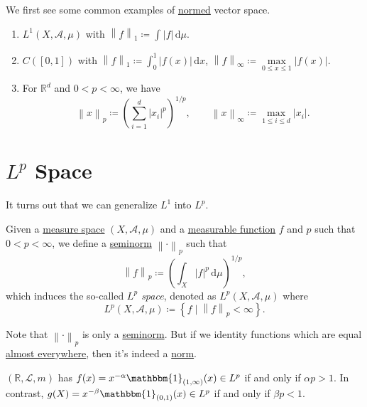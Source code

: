 \begin{eg}
	We first see some common examples of \hyperref[def:norm]{normed} vector space.
	\begin{enumerate}[(1)]
		\item \(L^1(X, \mathcal{A}  , \mu )\) with \(\left\lVert f\right\rVert _1 \coloneqq \int_{}^{} \left\vert f \right\vert  \,\mathrm{d}\mu  \).
		\item \(C([0, 1])\) with \(\left\lVert f\right\rVert _1 \coloneqq \int_{0}^{1} \left\vert f(x) \right\vert  \,\mathrm{d}x \), \(\left\lVert f\right\rVert _\infty \coloneqq \mathop{\max}\limits_{0\leq x\leq 1}\left\vert f(x) \right\vert \).
		\item For \(\mathbb{R} ^d\) and \(0 < p < \infty \), we have
		      \[
			      \left\lVert x\right\rVert _p \coloneqq \left(\sum\limits_{i=1}^{d} \left\vert x_{i}  \right\vert^p \right)^{1/p},\qquad \left\lVert x\right\rVert _\infty \coloneqq \mathop{\max} _{1\leq i\leq d}\left\vert x_{i}  \right\vert.
		      \]
	\end{enumerate}
\end{eg}

\section{\(L^{p} \) Space}
It turns out that we can generalize \hyperref[def:L1-space]{\(L^1\)} into \(L^p\).
\begin{definition}[\(L^p\) space]\label{def:L-p-space}
	Given a \hyperref[def:measure-space]{measure space} \((X, \mathcal{A} , \mu )\) and a \hyperref[def:measurable-function]{measurable function} \(f\) and \(p\) such that
	\(0 < p < \infty \), we define a \hyperref[def:seminorm]{seminorm} \(\left\lVert \cdot\right\rVert _p\) such that
	\[
		\left\lVert f\right\rVert _p \coloneqq \left(\int _X \left\vert f \right\vert ^p \,\mathrm{d} \mu \right)^{1/p},
	\]
	which induces the so-called \emph{\(L^p\) space}, denoted as \(L^p(X, \mathcal{A} , \mu )\) where
	\[
		L^p(X, \mathcal{A} , \mu ) \coloneqq \left\{f\mid \left\lVert f\right\rVert _p < \infty \right\}.
	\]
\end{definition}
\begin{remark}
	Note that \(\left\lVert \cdot\right\rVert _p\) is only a \hyperref[def:seminorm]{seminorm}. But if we identity functions which are equal \hyperref[def:mu-almost-everywhere]{almost everywhere},
	then it's indeed a \hyperref[def:norm]{norm}.
\end{remark}

\begin{eg}
	\((\mathbb{R} , \mathcal{L} , m)\) has \(f(x) = x^{-\alpha } \mathbbm{1}_{(1, \infty )}(x) \in L^p\) if and only if \(\alpha p > 1\).
	In contrast, \(g(X) = x^{-\beta } \mathbbm{1}_{(0, 1)}(x) \in L^p\) if and only if \(\beta p<1\).
\end{eg}

